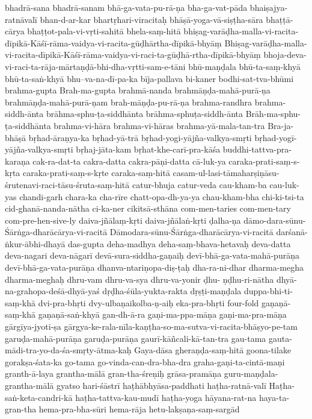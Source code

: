 {bhadrā-sana
bhadrā-sanam
bhā-ga-vata-pu-rā-ṇa
bha-ga-vat-pāda
bhaiṣajya-ratnāvalī
bhan-d-ar-kar
bhartṛhari-viracitaḥ
bhāṣā-yoga-vā-siṣṭha-sāra
bhaṭṭā-cārya
bhaṭṭot-pala-vi-vṛti-sahitā
bhela-saṃ-hitā
bhiṣag-varāḍha-malla-vi-racita-dīpikā-Kāśī-rāma-vaidya-vi-racita-gūḍhārtha-dīpikā-bhyāṃ
Bhiṣag-varāḍha-malla-vi-racita-dīpikā-Kāśī-rāma-vaidya-vi-raci-ta-gūḍhā-rtha-dīpikā-bhyāṃ
bhoja-deva-vi-raci-ta-rāja-mārtaṇḍā-bhi-dha-vṛtti-sam-e-tāni
bhū-maṇḍala
bhū-ta-saṃ-khyā
bhū-ta-saṅ-khyā
bhu--va-na-dī-pa-ka
bīja-pallava
bi-kaner
bodhi-sat-tva-bhūmi
brahma-gupta
Brah-ma-gupta
brahmā-nanda
brahmāṇḍa-mahā-purā-ṇa
brahmāṇḍa-mahā-purā-ṇam
brah-māṇḍa-pu-rā-ṇa
brahma-randhra
brahma-siddh-ānta
brāhma-sphu-ṭa-siddhānta
brāhma-sphuṭa-siddh-ānta
Brāh-ma-sphu-ṭa-siddhānta
brahma-vi-hāra
brahma-vi-hāras
brahma-yā-mala-tan-tra
Bra-ja-bhāṣā
bṛhad-āraṇya-ka
bṛhad-yā-trā
bṛhad-yogi-yājña-valkya-smṛti
bṛhad-yogī-yājña-valkya-smṛti
bṛhaj-jāta-kam
bṛhat-khe-carī-pra-kāśa
buddhi-tattva-pra-karaṇa
cak-ra-dat-ta
cakra-datta
cakra-pāṇi-datta
cā-luk-ya
caraka-prati-saṃ-s-kṛta
caraka-prati-saṃ-s-kṛte
caraka-saṃ-hitā
casam-ul-lasi-tāmaharṣiṇāsu-śrutenavi-raci-tāsu-śruta-saṃ-hitā
catur-bhuja
catur-veda
cau-kham-ba
cau-luk-yas
chandi-garh
chara-ka
cha-rīre
chatt-opa-dh-ya-ya
chau-kham-bha
chi-ki-tsi-ta
cid-ghanā-nanda-nātha
ci-ka-ner
cikitsā-sthāna
com-men-taries
com-men-tary
com-pre-hen-sive-ly
daiva-jñālaṃ-kṛti
daiva-jñālaṅ-kṛti
ḍalha-ṇa
dāmo-dara-sūnu-Śārṅga-dharācārya-vi-racitā
Dāmodara-sūnu-Śārṅga-dharācārya-vi-racitā
darśanā-ṅkur-ābhi-dhayā
das-gupta
deha-madhya
deha-saṃ-bhava-hetavaḥ
deva-datta
deva-nagari
deva-nāgarī
devā-sura-siddha-gaṇaiḥ
devī-bhā-ga-vata-mahā-purāṇa
devī-bhā-ga-vata-purāṇa
dhanva-ntariṇopa-diṣ-ṭaḥ
dha-ra-ni-dhar
dharma-megha
dharma-meghaḥ
dhru-vam
dhru-va-sya
dhru-va-yonir
ḍhu- ṇḍhu-ri-nātha
dhyā-na-grahopa-deśā-dhyā-yaś
dṛḍha-śūla-yukta-rakta
dṛṣṭi-maṇḍala
duppa-bhi-ti-saṃ-khā
dvi-pra-bhṛti
dvy-ulbaṇaikolba-ṇ-aiḥ
eka-pra-bhṛti
four-fold
gaṇaṇā-saṃ-khā
gaṇaṇā-saṅ-khyā
gan-dh-ā-ra
gaṇi-ma-ppa-māṇa
gaṇi-ma-pra-māṇa
gārgīya-jyoti-ṣa
gārgya-ke-rala-nīla-kaṇṭha-so-ma-sutva-vi-racita-bhāṣyo-pe-tam
garuḍa-mahā-purāṇa
garuḍa-purāṇa
gaurī-kāñcali-kā-tan-tra
gau-tama
gauta-mādi-tra-yo-da-śa-smṛty-ātma-kaḥ
Gaya-dāsa
gheraṇḍa-saṃ-hitā
goona-tilake
gorakṣa-śata-ka
go-tama
go-vinda-can-dra-bha-dra
graha-gaṇi-ta-cintā-maṇi
granth-ā-laya
grantha-mālā
gran-tha-śreṇiḥ
grāsa-pramāṇa
guru-maṇḍala-grantha-mālā
gyatso
hari-śāstrī
haṭhābhyāsa-paddhati
haṭha-ratnā-valī
Haṭha-saṅ-keta-candri-kā
haṭha-tattva-kau-mudī
haṭha-yoga
hāyana-rat-na
haya-ta-gran-tha
hema-pra-bha-sūri
hema-rāja
hetu-lakṣaṇa-saṃ-sargād
}
